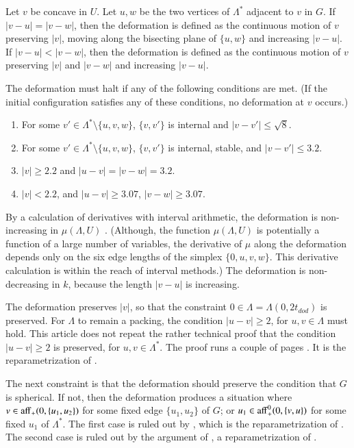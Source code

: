 \documentclass{article} %
\begin{document}
Let $v$ be concave in $U$.  Let $u,w$ be the two vertices of
$\Lambda^*$ adjacent to $v$ in $G$. 
If $|v-u|=|v-w|$, then the deformation is defined as the continuous motion
of $v$ preserving $|v|$,  moving along the bisecting plane of $\{u,w\}$
and increasing $|v-u|$.  If $|v-u|<|v-w|$, then the deformation
is defined as the continuous motion of $v$ preserving $|v|$ and
$|v-w|$ and increasing $|v-u|$.

The deformation must halt if any of the following conditions
are met.  (If the initial configuration satisfies any of these conditions,
no deformation at $v$ occurs.)
\begin{enumerate}\label{e:halt}
\item For some $v'\in\Lambda^*\setminus\{u,v,w\}$, 
$\{v,v'\}$ is internal and $|v-v'|\le \sqrt8$.
\item For some $v'\in\Lambda^*\setminus\{u,v,w\}$,
$\{v,v'\}$ is internal, stable, and $|v-v'|\le 3.2$.
\item $|v|\ge 2.2$ and $|u-v|=|v-w|=3.2$.  
\item $|v|< 2.2$, 
and $|u-v|\ge 3.07$, $|v-w|\ge 3.07$.
\end{enumerate}

By a calculation of derivatives with interval arithmetic,
the deformation is non-increasing in $\mu(\Lambda,U)$ \cite[Lemma~7.7]{Hales:2002:Dodec}.  (Although, the function $\mu(\Lambda,U)$ is potentially a 
function of a large number of variables, the derivative of $\mu$
along the deformation depends only on the six edge lengths  of
the simplex $\{0,u,v,w\}$.  This derivative calculation is within
the reach of interval methods.)
The deformation is non-decreasing in $k$, because the length
$|v-u|$ is increasing.

The deformation preserves $|v|$,
so that the constraint $0\in\Lambda=\Lambda(0,2t_{dod})$ is preserved.
For $\Lambda$ to remain a packing,  the condition
 $|u-v|\ge 2$, for $u,v\in \Lambda$ must hold.
This article does not repeat the rather technical proof that
the condition
 $|u-v|\ge 2$ is preserved, for $u,v\in\Lambda^*$.  The proof
runs a couple  of pages \cite[Lemma~7.6]{Hales:2002:Dodec}.
It is the reparametrization of \cite[Lemma~12.20]{Hales:2006:DCG}.

The next constraint is that the deformation should preserve the condition
that $G$ is spherical.  
If not, then the deformation produces
a situation where $v\in {\operatorname{aff}}_+(0,\{u_1,u_2\})$ for some fixed edge $\{u_1,u_2\}$
of $G$; or $u_1\in {\operatorname{aff}}_+^0(0,\{v,u\})$ for some fixed $u_1$ of $\Lambda^*$.
The first case is ruled out by \cite[Remark~p.22]{Hales:2002:Dodec}, which is the reparametrization of \cite[\S12.7,p.132]{Hales:2006:DCG}.  The second case is ruled out by 
the argument of \cite[p.27]{Hales:2002:Dodec}, a reparametrization of 
\cite[\S12.8,p.134]{Hales:2006:DCG}.
\end{document}
